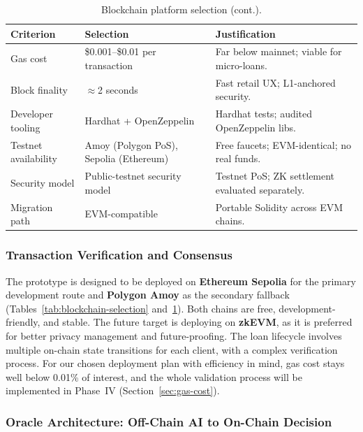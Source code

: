 \documentclass[12pt,a4paper]{report}
\newcommand{\tableheadcolor}{\rowcolor{TableHeadBg}}
\begin{document}
\begin{table}[H]
\centering
\caption[Blockchain platform selection (cont.)]{Blockchain platform selection (cont.).}
\label{tab:blockchain-selection-cont}
\begin{tabular}{p{3.5cm}p{3.5cm}p{6.5cm}}
\toprule
\tableheadcolor
\textbf{Criterion} & \textbf{Selection} & \textbf{Justification} \\
\midrule
Gas cost & \$0.001--\$0.01 per transaction & Far below mainnet; viable for micro-loans. \\
Block finality & $\approx$2 seconds & Fast retail UX; L1-anchored security. \\
Developer tooling & Hardhat + OpenZeppelin & Hardhat tests; audited OpenZeppelin libs. \\
Testnet availability & Amoy (Polygon PoS), Sepolia (Ethereum) & Free faucets; EVM-identical; no real funds. \\
Security model & Public-testnet security model & Testnet PoS; ZK settlement evaluated separately. \\
Migration path & EVM-compatible & Portable Solidity across EVM chains. \\
\bottomrule
\end{tabular}
\end{table}

\subsubsection{Transaction Verification and Consensus}

The prototype is designed to be deployed on \textbf{Ethereum Sepolia} for the primary development route and \textbf{Polygon Amoy} as the secondary fallback (Tables~\ref{tab:blockchain-selection} and~\ref{tab:blockchain-selection-cont}). Both chains are free, development-friendly, and stable. The future target is deploying on \textbf{zkEVM}, as it is preferred for better privacy management and future-proofing. The loan lifecycle involves multiple on-chain state transitions for each client, with a complex verification process. For our chosen deployment plan with efficiency in mind, gas cost stays well below 0.01\% of interest, and the whole validation process will be implemented in Phase~IV (Section~\ref{sec:gas-cost}).

\subsubsection{Oracle Architecture: Off-Chain AI to On-Chain Decision}
\label{sec:oracle-architecture}
\end{document}
